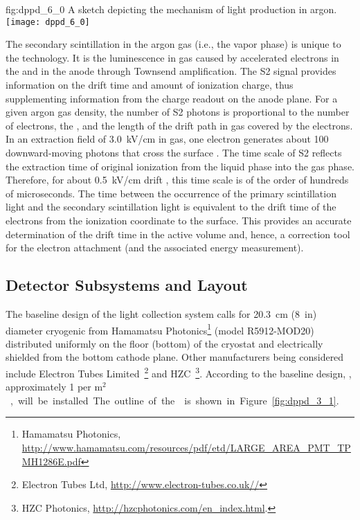 \begin{dunefigure}{fig:dppd_6_0}
{A sketch depicting the mechanism of light production in argon.}
\texttt{[image: dppd\_6\_0]}
\end{dunefigure}

The secondary scintillation in the argon gas (i.e., the vapor phase) is unique to the  technology. It is the luminescence in gas caused by accelerated electrons in the \efield and in the  anode through Townsend amplification. The S2 signal provides information on the drift time and amount of ionization charge, thus supplementing information from the charge readout on the anode plane. For a given argon gas density, the number of S2 photons is proportional to the number of electrons, the \efield, and the length of the drift path in gas covered by the electrons. In an extraction field of \SI{3.0}{kV/cm} in gas, one electron generates about \num{100} downward-moving photons that cross the  surface \cite{Lux:2018zwd}. The time scale of S2 reflects the extraction time of original ionization from the liquid phase into the gas phase. Therefore, for about \SI{0.5}{kV/cm} drift \efield, this time scale is of the order of hundreds of microseconds. The time between the occurrence of the primary scintillation light and the secondary scintillation light is equivalent to the drift time of the electrons from the ionization coordinate to the \lar surface. This provides an accurate determination of the drift time in the active volume and, hence, a correction tool for the electron attachment (and the associated energy measurement).  

\subsection{Detector Subsystems and Layout}
\label{sec:dp-pds-overview_layout}

The baseline design of the light collection system calls for \SI{20.3}{cm} (\SI{8}{in}) diameter cryogenic  from Hamamatsu Photonics\footnote{Hamamatsu Photonics\texttrademark{}, \url{http://www.hamamatsu.com/resources/pdf/etd/LARGE_AREA_PMT_TPMH1286E.pdf}} (model R5912-MOD20) distributed uniformly on the floor (bottom) of the cryostat and electrically shielded from the bottom cathode plane. Other  manufacturers being considered include Electron Tubes Limited~\footnote{Electron Tubes Ltd\texttrademark{}, \url{http://www.electron-tubes.co.uk//}} and HZC~\footnote{HZC Photonics\texttrademark{}, \url{http://hzcphotonics.com/en_index.html}.}. According to the baseline design, \dpnumpmtch {}, approximately \num{1} per \si{m$^2$}, will be installed. The outline of the  is shown in Figure~\ref{fig:dppd_3_1}.

